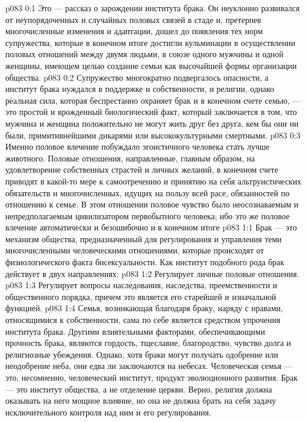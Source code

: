 \author{Глава Серафимов}
\vs p083 0:1 Это --- рассказ о зарождении института брака. Он неуклонно развивался от неупорядоченных и случайных половых связей в стаде и, претерпев многочисленные изменения и адаптации, дошел до появления тех норм супружества, которые в конечном итоге достигли кульминации в осуществлении половых отношений между двумя людьми, в союзе одного мужчины и одной женщины, имеющем целью создание семьи как высочайшей формы организации общества.
\vs p083 0:2 Супружество многократно подвергалось опасности, а институт брака нуждался в поддержке и собственности, и религии, однако реальная сила, которая беспрестанно охраняет брак и в конечном счете семью, --- это простой и врожденный биологический факт, который заключается в том, что мужчина и женщина положительно не могут жить друг без друга, кем бы они ни были, примитивнейшими дикарями или высококультурными смертными.
\vs p083 0:3 Именно половое влечение побуждало эгоистичного человека стать лучше животного. Половые отношения, направленные, главным образом, на удовлетворение собственных страстей и личных желаний, в конечном счете приводят в какой\hyp{}то мере к самоотречению и принятию на себя альтруистических обязательств и многочисленных, идущих на пользу всей расе, обязанностей по отношению к семье. В этом отношении половое чувство было неосознаваемым и непредполагаемым цивилизатором первобытного человека; ибо это же половое влечение автоматически и безошибочно  и в конечном итоге 
\vs p083 1:1 Брак --- это механизм общества, предназначенный для регулирования и управления теми многочисленными человеческими отношениями, которые происходят от физиологического факта бисексуальности. Как институт подобного рода брак действует в двух направлениях:
\vs p083 1:2 \bibnobreakspace Регулирует личные половые отношения.
\vs p083 1:3 \bibnobreakspace Регулирует вопросы наследования, наследства, преемственности и общественного порядка, причем это является его старейшей и изначальной функцией.
\vs p083 1:4 \pc Семья, возникающая благодаря браку, наряду с нравами, относящимися к собственности, сама по себе является средством упрочения института брака. Другими влиятельными факторами, обеспечивающими прочность брака, являются гордость, тщеславие, благородство, чувство долга и религиозные убеждения. Однако, хотя браки могут получать одобрение или неодобрение неба, они едва ли заключаются на небесах. Человеческая семья --- это, несомненно, человеческий институт, продукт эволюционного развития. Брак --- это институт общества, а не отделение церкви. Верно, религия должна оказывать на него мощное влияние, но она не должна брать на себя задачу исключительного контроля над ним и его регулирования.
